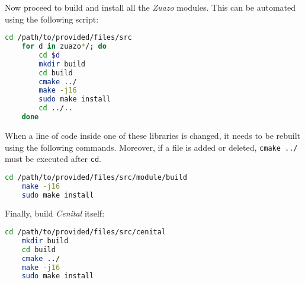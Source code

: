 \documentclass[../main.tex]{subfiles}
\begin{document}
Now proceed to build and install all the \textit{Zuazo} modules. This can be automated using the following script:

\begin{lstlisting}[language=bash]
    cd /path/to/provided/files/src
    for d in zuazo*/; do
        cd $d
        mkdir build
        cd build
        cmake ../
        make -j16
        sudo make install
        cd ../..
    done
\end{lstlisting}

When a line of code inside one of these libraries is changed, it needs to be rebuilt using the following commands. Moreover, if a file is added or deleted, \texttt{cmake ../} must be executed after \texttt{cd}.\newline

\begin{lstlisting}[language=bash]
    cd /path/to/provided/files/src/module/build
    make -j16
    sudo make install
\end{lstlisting}

Finally, build \textit{Cenital} itself:

\begin{lstlisting}[language=bash]
    cd /path/to/provided/files/src/cenital
    mkdir build
    cd build
    cmake ../
    make -j16
    sudo make install
\end{lstlisting}
\end{document}
